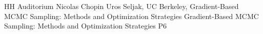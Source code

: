 {HH Auditorium}	%
{Nicolas Chopin}		%
{Uros Seljak, UC Berkeley, Gradient-Based MCMC Sampling: Methods and Optimization Strategies}	%
{Gradient-Based MCMC Sampling: Methods and Optimization Strategies}		%
{P6}		%
\\\hline
